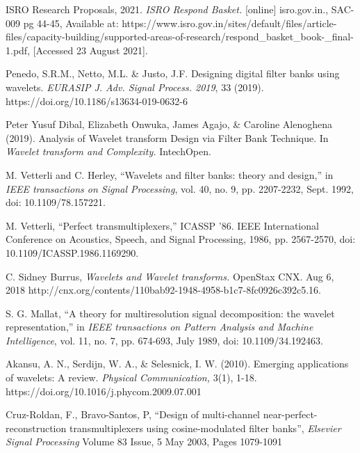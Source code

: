 \documentclass[conference]{IEEEtran}
\begin{document}
\begin{thebibliography}{00}


ISRO Research Proposals, 2021. \textit{ISRO Respond Basket.} [online] isro.gov.in., SAC-009 pg 44-45, Available at: https://www.isro.gov.in/sites/default/files/article-files/capacity-building/supported-areas-of-research/respond\_basket\_book-\_final-1.pdf, [Accessed 23 August 2021].

Penedo, S.R.M., Netto, M.L. \& Justo, J.F. Designing digital filter banks using wavelets. \textit{EURASIP J. Adv. Signal Process. 2019}, 33 (2019). https://doi.org/10.1186/s13634-019-0632-6

Peter Yusuf Dibal, Elizabeth Onwuka, James Agajo, \& Caroline Alenoghena (2019). Analysis of Wavelet transform Design via Filter Bank Technique. In \textit{Wavelet transform and Complexity.} IntechOpen.

M. Vetterli and C. Herley, ``Wavelets and filter banks: theory and design,'' in \textit{IEEE transactions on Signal Processing}, vol. 40, no. 9, pp. 2207-2232, Sept. 1992, doi: 10.1109/78.157221.

M. Vetterli, ``Perfect transmultiplexers,'' ICASSP '86. IEEE International Conference on Acoustics, Speech, and Signal Processing, 1986, pp. 2567-2570, doi: 10.1109/ICASSP.1986.1169290.

C. Sidney Burrus, \textit{Wavelets and Wavelet transforms.} OpenStax CNX. Aug 6, 2018 http://cnx.org/contents/110bab92-1948-4958-b1c7-8fc0926c392c\@5.16. 

S. G. Mallat, ``A theory for multiresolution signal decomposition: the wavelet representation,'' in \textit{IEEE transactions on Pattern Analysis and Machine Intelligence}, vol. 11, no. 7, pp. 674-693, July 1989, doi: 10.1109/34.192463.

Akansu, A. N., Serdijn, W. A., \& Selesnick, I. W. (2010). Emerging applications of wavelets: A review. \textit{Physical Communication,} 3(1), 1-18. https://doi.org/10.1016/j.phycom.2009.07.001

Cruz-Roldan, F., Bravo-Santos, P, ``Design of multi-channel near-perfect-reconstruction transmultiplexers using cosine-modulated filter banks'', \textit{Elsevier Signal Processing} Volume 83 Issue, 5 May 2003, Pages 1079-1091


\end{thebibliography}
\end{document}

